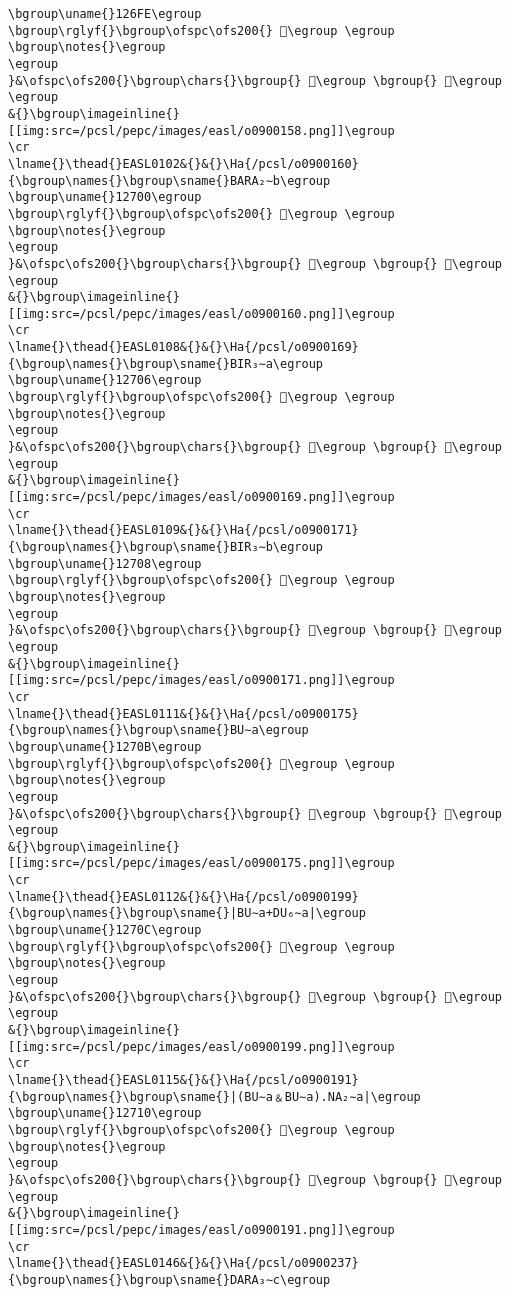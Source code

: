 \begin{verbatim}
\bgroup\uname{}126FE\egroup
\bgroup\rglyf{}\bgroup\ofspc\ofs200{} 𒛾\egroup \egroup
\bgroup\notes{}\egroup
\egroup
}&\ofspc\ofs200{}\bgroup\chars{}\bgroup{} 𒛾\egroup \bgroup{} 𒛿\egroup \egroup
&{}\bgroup\imageinline{}[[img:src=/pcsl/pepc/images/easl/o0900158.png]]\egroup
\cr
\lname{}\thead{}EASL0102&{}&{}\Ha{/pcsl/o0900160}{\bgroup\names{}\bgroup\sname{}BARA₂∼b\egroup
\bgroup\uname{}12700\egroup
\bgroup\rglyf{}\bgroup\ofspc\ofs200{} 𒜀\egroup \egroup
\bgroup\notes{}\egroup
\egroup
}&\ofspc\ofs200{}\bgroup\chars{}\bgroup{} 𒜀\egroup \bgroup{} 𒜁\egroup \egroup
&{}\bgroup\imageinline{}[[img:src=/pcsl/pepc/images/easl/o0900160.png]]\egroup
\cr
\lname{}\thead{}EASL0108&{}&{}\Ha{/pcsl/o0900169}{\bgroup\names{}\bgroup\sname{}BIR₃∼a\egroup
\bgroup\uname{}12706\egroup
\bgroup\rglyf{}\bgroup\ofspc\ofs200{} 𒜆\egroup \egroup
\bgroup\notes{}\egroup
\egroup
}&\ofspc\ofs200{}\bgroup\chars{}\bgroup{} 𒜇\egroup \bgroup{} 𒜆\egroup \egroup
&{}\bgroup\imageinline{}[[img:src=/pcsl/pepc/images/easl/o0900169.png]]\egroup
\cr
\lname{}\thead{}EASL0109&{}&{}\Ha{/pcsl/o0900171}{\bgroup\names{}\bgroup\sname{}BIR₃∼b\egroup
\bgroup\uname{}12708\egroup
\bgroup\rglyf{}\bgroup\ofspc\ofs200{} 𒜈\egroup \egroup
\bgroup\notes{}\egroup
\egroup
}&\ofspc\ofs200{}\bgroup\chars{}\bgroup{} 𒜉\egroup \bgroup{} 𒜈\egroup \egroup
&{}\bgroup\imageinline{}[[img:src=/pcsl/pepc/images/easl/o0900171.png]]\egroup
\cr
\lname{}\thead{}EASL0111&{}&{}\Ha{/pcsl/o0900175}{\bgroup\names{}\bgroup\sname{}BU∼a\egroup
\bgroup\uname{}1270B\egroup
\bgroup\rglyf{}\bgroup\ofspc\ofs200{} 𒜋\egroup \egroup
\bgroup\notes{}\egroup
\egroup
}&\ofspc\ofs200{}\bgroup\chars{}\bgroup{} 𒜓\egroup \bgroup{} 𒜋\egroup \egroup
&{}\bgroup\imageinline{}[[img:src=/pcsl/pepc/images/easl/o0900175.png]]\egroup
\cr
\lname{}\thead{}EASL0112&{}&{}\Ha{/pcsl/o0900199}{\bgroup\names{}\bgroup\sname{}|BU∼a+DU₆∼a|\egroup
\bgroup\uname{}1270C\egroup
\bgroup\rglyf{}\bgroup\ofspc\ofs200{} 𒜌\egroup \egroup
\bgroup\notes{}\egroup
\egroup
}&\ofspc\ofs200{}\bgroup\chars{}\bgroup{} 𒜌\egroup \bgroup{} 𒜍\egroup \egroup
&{}\bgroup\imageinline{}[[img:src=/pcsl/pepc/images/easl/o0900199.png]]\egroup
\cr
\lname{}\thead{}EASL0115&{}&{}\Ha{/pcsl/o0900191}{\bgroup\names{}\bgroup\sname{}|(BU∼a﹠BU∼a).NA₂∼a|\egroup
\bgroup\uname{}12710\egroup
\bgroup\rglyf{}\bgroup\ofspc\ofs200{} 𒜐\egroup \egroup
\bgroup\notes{}\egroup
\egroup
}&\ofspc\ofs200{}\bgroup\chars{}\bgroup{} 𒜐\egroup \bgroup{} 𒜑\egroup \egroup
&{}\bgroup\imageinline{}[[img:src=/pcsl/pepc/images/easl/o0900191.png]]\egroup
\cr
\lname{}\thead{}EASL0146&{}&{}\Ha{/pcsl/o0900237}{\bgroup\names{}\bgroup\sname{}DARA₃∼c\egroup

\end{verbatim}
